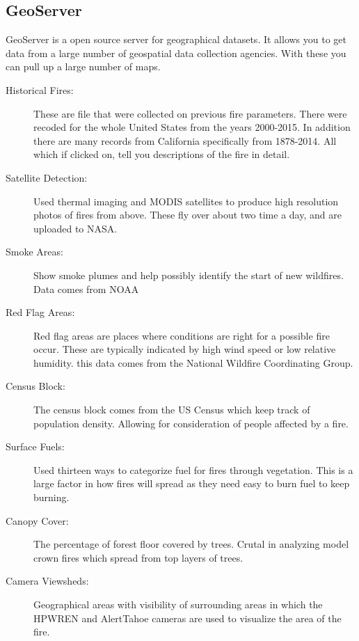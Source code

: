 \documentclass[sigconf]{acmart}
\begin{document}
\subsection{GeoServer}
GeoServer is a open source server for geographical datasets.  It allows 
you to get data from a large number of geospatial data collection 
agencies.  With these you can pull up a large number of maps.
\begin{description}
\item [Historical Fires:] These are file that were collected on 
previous fire parameters.  There were recoded for the whole United 
States from the years 2000-2015.  In addition there are many records 
from California specifically from 1878-2014.  All which if clicked on, 
tell you descriptions of the fire in detail.
\item [Satellite Detection:] Used thermal imaging and MODIS satellites 
to produce high resolution photos of fires from above.  These fly over 
about two time a day, and are uploaded to NASA.
\item [Smoke Areas:] Show smoke plumes and help possibly identify 
the start of new wildfires. Data comes from NOAA
\item [Red Flag Areas:] Red flag areas are places where conditions are 
right for a possible fire occur. These are typically indicated by high 
wind speed or low relative humidity.  this data comes from the 
National Wildfire Coordinating Group.
\item [Census Block:]The census block comes from the US Census which 
keep track of population density.  Allowing for consideration of people 
affected by a fire.
\item [Surface Fuels:] Used thirteen ways to categorize fuel for fires 
through vegetation.  This is a large factor in how fires will spread as 
they need easy to burn fuel to keep burning.
\item [Canopy Cover:] The percentage of forest floor covered by trees.  
Crutal in analyzing model crown fires which spread from top layers of 
trees.
\item [Camera Viewsheds:] Geographical areas with visibility of surrounding areas in which the HPWREN and AlertTahoe cameras are used to visualize the area of the fire.
\end{description}
\end{document}

